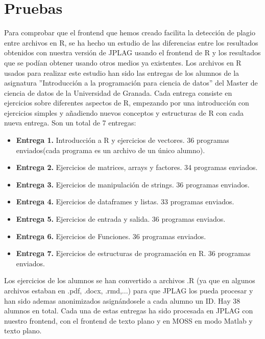 \section{Pruebas}

Para comprobar que el frontend que hemos creado facilita la detección de plagio entre archivos en R, se ha hecho un estudio de las diferencias entre los resultados obtenidos con nuestra versión de JPLAG usando el frontend de R y los resultados que se podían obtener usando otros medios ya existentes.
\newline
Los archivos en R usados para realizar este estudio han sido las entregas de los alumnos de la asignatura ''Introducción a la programación para ciencia de datos'' del Master de ciencia de datos de la Universidad de Granada.
\newline
Cada entrega consiste en ejercicios sobre diferentes aspectos de R, empezando por una introducción con ejercicios simples y añadiendo nuevos conceptos y estructuras de R con cada nueva entrega.
\newline
Son un total de 7 entregas:
\begin{itemize}
\item \textbf{Entrega 1.} Introducción a R y ejercicios de vectores. 36 programas enviados(cada programa es un archivo de un único alumno).
\item \textbf{Entrega 2.} Ejercicios de matrices, arrays y factores. 34 programas enviados.
\item \textbf{Entrega 3.} Ejercicios de manipulación de strings. 36 programas enviados.
\item \textbf{Entrega 4.} Ejercicios de dataframes y listas. 33 programas enviados.
\item \textbf{Entrega 5.} Ejercicios de entrada y salida. 36 programas enviados.
\item \textbf{Entrega 6.} Ejercicios de Funciones. 36 programas enviados.
\item \textbf{Entrega 7.} Ejercicios de estructuras de programación en R. 36 programas enviados.
\end{itemize}
Los ejercicios de los alumnos se han convertido a archivos .R (ya que en algunos archivos estaban en .pdf, .docx, .rmd,...) para que JPLAG los pueda procesar y han sido ademas anonimizados asignándosele a cada alumno un ID. Hay 38 alumnos en total.
\newline
Cada una de estas entregas ha sido procesada en JPLAG con nuestro frontend, con el frontend de texto plano y en MOSS en modo Matlab y texto plano.

